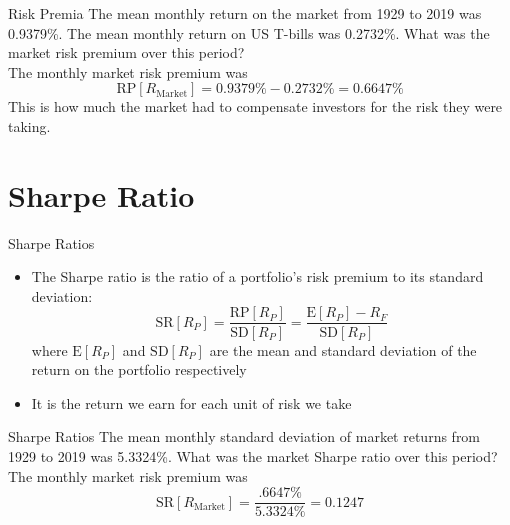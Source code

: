 \documentclass{beamer}
\begin{document}
\begin{frame}{Risk Premia}
	The mean monthly return on the market from 1929 to 2019 was 0.9379\%. The mean monthly return on US T-bills was 0.2732\%. What was the market risk premium over this period?\\
	\pause
	{\color{blue}
		The monthly market risk premium was
		\begin{equation}
			\text{RP}[R_{\text{Market}}]=0.9379\%-0.2732\%=0.6647\%
		\end{equation}
		This is how much the market had to compensate investors for the risk they were taking.
	}
\end{frame}

\section{Sharpe Ratio}

\begin{frame}{Sharpe Ratios}
	\begin{itemize}
		\item The Sharpe ratio is the ratio of a portfolio's risk premium to its standard deviation:
			\begin{equation}
				\text{SR}[R_{P}]=\frac{\text{RP}[R_{P}]}{\text{SD}[R_{P}]}=\frac{\text{E}[R_{P}]-R_{F}}{\text{SD}[R_{P}]}
			\end{equation}
			where $\text{E}[R_{P}]$ and $\text{SD}[R_{P}]$ are the mean and standard deviation of the return on the portfolio respectively 
		\item It is the return we earn for each unit of risk we take
	\end{itemize}
\end{frame}

\begin{frame}{Sharpe Ratios}
	The mean monthly standard deviation of market returns from 1929 to 2019 was 5.3324\%. What was the market Sharpe ratio over this period?\\
	\pause
	{\color{blue}
		The monthly market risk premium was
		\begin{equation}
			\text{SR}[R_{\text{Market}}]=\frac{.6647\%}{5.3324\%}=0.1247
		\end{equation}
}
\end{frame}
\end{document}
